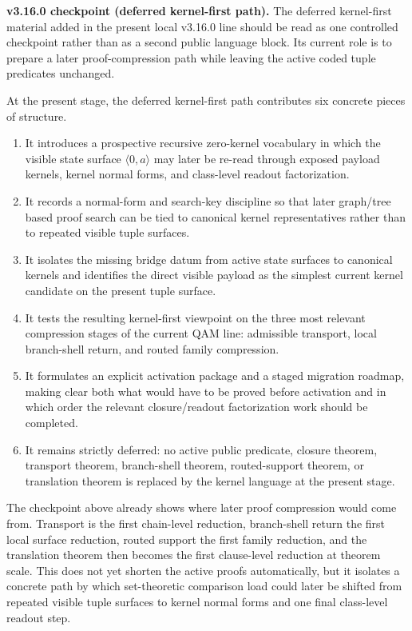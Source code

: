 \noindent\textbf{v3.16.0 checkpoint (deferred kernel-first path).} The deferred kernel-first material added in the present local v3.16.0 line should be read as one controlled checkpoint rather than as a second public language block. Its current role is to prepare a later proof-compression path while leaving the active coded tuple predicates unchanged.

\begin{remark}\label{rem:qam-zero-kernel-checkpoint}
At the present stage, the deferred kernel-first path contributes six concrete pieces of structure.
\begin{enumerate}[leftmargin=2em]
  \item It introduces a prospective recursive zero-kernel vocabulary in which the visible state surface $\langle 0,a\rangle$ may later be re-read through exposed payload kernels, kernel normal forms, and class-level readout factorization.
  \item It records a normal-form and search-key discipline so that later graph/tree based proof search can be tied to canonical kernel representatives rather than to repeated visible tuple surfaces.
  \item It isolates the missing bridge datum from active state surfaces to canonical kernels and identifies the direct visible payload as the simplest current kernel candidate on the present tuple surface.
  \item It tests the resulting kernel-first viewpoint on the three most relevant compression stages of the current QAM line: admissible transport, local branch-shell return, and routed family compression.
  \item It formulates an explicit activation package and a staged migration roadmap, making clear both what would have to be proved before activation and in which order the relevant closure/readout factorization work should be completed.
  \item It remains strictly deferred: no active public predicate, closure theorem, transport theorem, branch-shell theorem, routed-support theorem, or translation theorem is replaced by the kernel language at the present stage.
\end{enumerate}
\end{remark}

\begin{remark}\label{rem:qam-zero-kernel-checkpoint-why}
The checkpoint above already shows where later proof compression would come from. Transport is the first chain-level reduction, branch-shell return the first local surface reduction, routed support the first family reduction, and the translation theorem then becomes the first clause-level reduction at theorem scale. This does not yet shorten the active proofs automatically, but it isolates a concrete path by which set-theoretic comparison load could later be shifted from repeated visible tuple surfaces to kernel normal forms and one final class-level readout step.
\end{remark}

